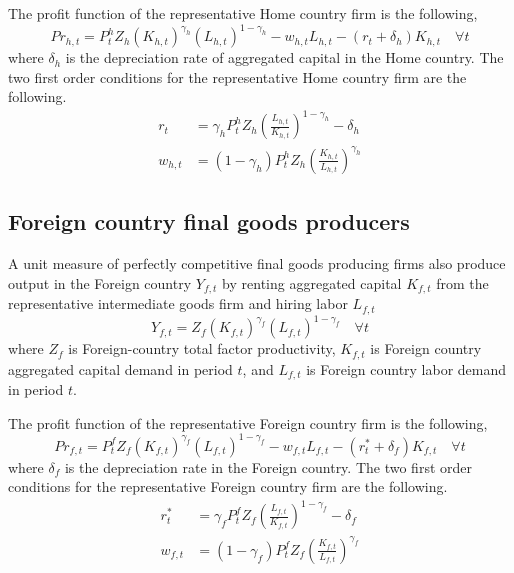 \documentclass[letterpaper,12pt]{article}
\theoremstyle{definition}
\begin{document}
    The profit function of the representative Home country firm is the following,
    \begin{equation}\label{EqLgOpenProfit_H}
      Pr_{h,t} = P^h_t Z_h \left(K_{h,t}\right)^{\gamma_h}\left(L_{h,t}\right)^{1-\gamma_h} - w_{h,t}L_{h,t} - (r_t + \delta_h)K_{h,t} \quad\forall t
    \end{equation}
    where $\delta_h$ is the depreciation rate of aggregated capital in the Home country. The two first order conditions for the representative Home country firm are the following.
    \begin{align}
      r_t &= \gamma_h P^h_t Z_h\left(\frac{L_{h,t}}{K_{h,t}}\right)^{1-\gamma_h} - \delta_h \label{EqLgOpenFirmFOCK_H} \\
      w_{h,t} &= (1-\gamma_h)P^h_t Z_h\left(\frac{K_{h,t}}{L_{h,t}}\right)^{\gamma_h} \label{EqLgOpenFirmFOCL_H}
    \end{align}


  \subsection{Foreign country final goods producers}\label{SecLgOpenFirmFinal_F}

    A unit measure of perfectly competitive final goods producing firms also produce output in the Foreign country $Y_{f,t}$ by renting aggregated capital $K_{f,t}$ from the representative intermediate goods firm and hiring labor $L_{f,t}$
    \begin{equation}\label{EqLgOpenProdFunc_F}
      Y_{f,t} = Z_f \left(K_{f,t}\right)^{\gamma_f}\left(L_{f,t}\right)^{1-\gamma_f} \quad\forall t
    \end{equation}
    where $Z_f$ is Foreign-country total factor productivity, $K_{f,t}$ is Foreign country aggregated capital demand in period $t$, and $L_{f,t}$ is Foreign country labor demand in period $t$.

    The profit function of the representative Foreign country firm is the following,
    \begin{equation}\label{EqLgOpenProfit_F}
      Pr_{f,t} = P^f_t Z_f \left(K_{f,t}\right)^{\gamma_f}\left(L_{f,t}\right)^{1-\gamma_f} - w_{f,t}L_{f,t} - (r^*_t + \delta_f)K_{f,t} \quad\forall t
    \end{equation}
    where $\delta_f$ is the depreciation rate in the Foreign country. The two first order conditions for the representative Foreign country firm are the following.
    \begin{align}
      r^*_t &= \gamma_f P^f_t Z_f\left(\frac{L_{f,t}}{K_{f,t}}\right)^{1-\gamma_f} - \delta_f \label{EqLgOpenFirmFOCK_F} \\
      w_{f,t} &= (1-\gamma_f)P^f_t Z_f\left(\frac{K_{f,t}}{L_{f,t}}\right)^{\gamma_f} \label{EqLgOpenFirmFOCL_F}
    \end{align}
\end{document}
